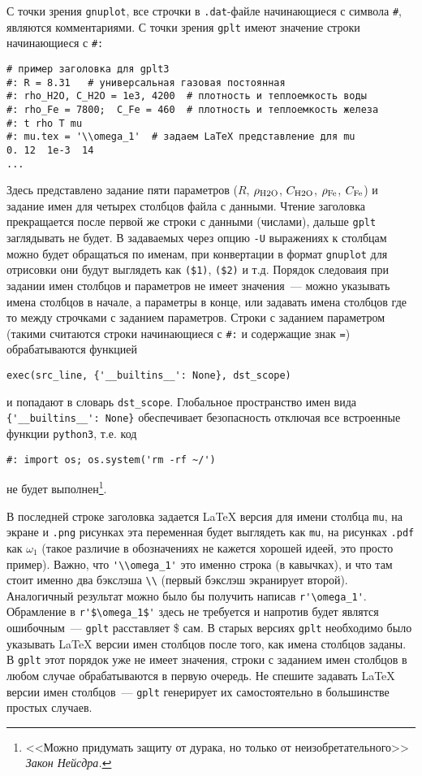 \documentclass[12pt]{article}
\def\gplt{{\tt gplt}}
\def\gnuplot{{\tt gnuplot}}
\def\python{{\tt python3}}
\def\png{{\tt .png}}
\def\pdf{{\tt .pdf}}
\begin{document}
С точки зрения \gnuplot, все строчки в \verb'.dat'-файле начинающиеся с символа \verb'#', являются комментариями. С точки зрения \gplt{}
имеют значение строки начинающиеся с \verb'#:'
\begin{verbatim}
# пример заголовка для gplt3
#: R = 8.31   # универсальная газовая постоянная
#: rho_H2O, C_H2O = 1e3, 4200  # плотность и теплоемкость воды
#: rho_Fe = 7800;  C_Fe = 460  # плотность и теплоемкость железа
#: t rho T mu
#: mu.tex = '\\omega_1'  # задаем LaTeX представление для mu
0. 12  1e-3  14
...
\end{verbatim}
Здесь представлено задание пяти параметров ($R$, $\rho_{\rm H2O}$, $C_{\rm H2O}$, $\rho_{\rm Fe}$, $C_{\rm Fe}$) и задание имен для четырех столбцов файла с данными.
Чтение заголовка прекращается после первой же строки с данными (числами), дальше \gplt{} заглядывать не будет. В задаваемых через опцию \verb'-U'
выражениях к столбцам можно будет обращаться по именам, при конвертации в формат \gnuplot{} для отрисовки они будут выглядеть как \verb'($1)', \verb'($2)' и т.д.
Порядок следоваия при задании имен столбцов и параметров не имеет значения~--- можно указывать имена столбцов в начале, а параметры в конце, или задавать имена столбцов
где то между строчками с заданием параметров. Строки с заданием параметром (такими считаются строки начинающиеся с \verb'#:' и содержащие знак \verb'=')
обрабатываются функцией
\begin{verbatim}
exec(src_line, {'__builtins__': None}, dst_scope)
\end{verbatim}
и попадают в словарь \verb'dst_scope'. Глобальное пространство имен вида \verb|{'__builtins__': None}| обеспечивает безопасность отключая все
встроенные функции \python{}, т.е. код
\begin{verbatim}
#: import os; os.system('rm -rf ~/')
\end{verbatim}
не будет выполнен\footnote{<<Можно придумать защиту от дурака, но только от неизобретательного>> {\it Закон Нейсдра.}}. 


В последней строке заголовка задается \LaTeX{} версия для имени столбца \verb'mu', на экране и \png{} рисунках эта переменная
будет выглядеть как \verb'mu', на рисунках \pdf{} как $\omega_1$ (такое различие в обозначениях не кажется хорошей идеей, это просто пример).
Важно, что \verb|'\\omega_1'| это именно строка (в кавычках), и что там стоит именно два бэкслэша \verb'\\' (первый бэкслэш экранирует второй).
Аналогичный результат можно было бы получить написав \verb|r'\omega_1'|. Обрамление в \verb|r'$\omega_1$'| здесь не требуется и напротив будет являтся
ошибочным~--- \gplt{} расставляет \$ сам.
В старых версиях \verb'gplt' необходимо было указывать \LaTeX{} версии имен столбцов после того, как имена столбцов заданы.
В \gplt{} этот порядок уже не имеет значения, строки с заданием имен столбцов в любом случае обрабатываются в первую очередь.
Не спешите задавать \LaTeX{} версии имен столбцов~--- \gplt{} генерирует их самостоятельно в большинстве простых случаев.
\end{document}
